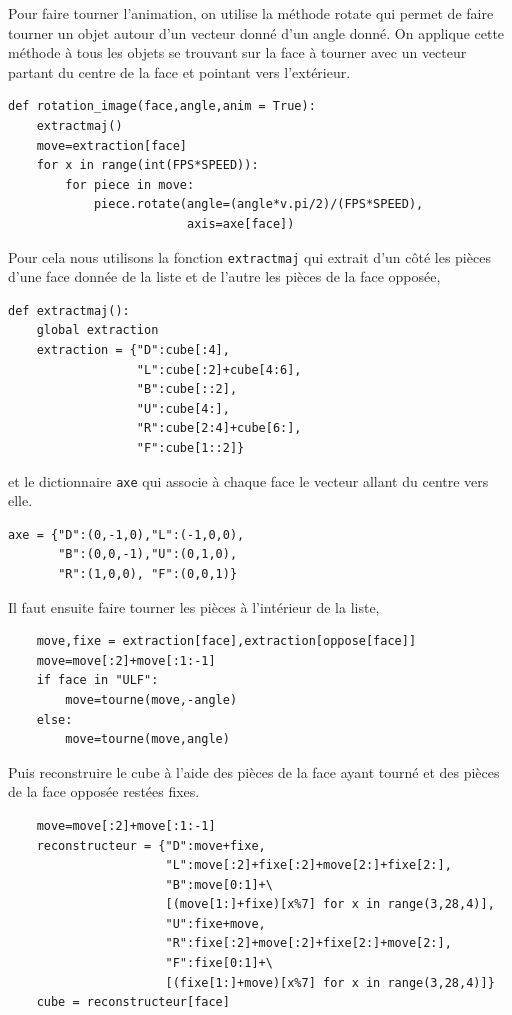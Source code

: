 \documentclass[11pt,a4paper]{article}
\begin{document}
Pour faire tourner l'animation, on utilise la méthode rotate qui permet de faire tourner un objet autour
d'un vecteur donné d'un angle donné. On applique cette méthode à tous les objets se trouvant sur la face
à tourner avec un vecteur partant du centre de la face et pointant vers l'extérieur.
\begin{lstlisting}
def rotation_image(face,angle,anim = True):
    extractmaj()
    move=extraction[face]
    for x in range(int(FPS*SPEED)):
        for piece in move:
            piece.rotate(angle=(angle*v.pi/2)/(FPS*SPEED),
                         axis=axe[face])
\end{lstlisting}
Pour cela nous utilisons la fonction \texttt{extractmaj} qui extrait d'un côté les pièces d'une face donnée de la liste et de l'autre les pièces
de la face opposée,
\begin{lstlisting}
def extractmaj():
    global extraction
    extraction = {"D":cube[:4],
                  "L":cube[:2]+cube[4:6],
                  "B":cube[::2],
                  "U":cube[4:],
                  "R":cube[2:4]+cube[6:],
                  "F":cube[1::2]}
\end{lstlisting} 
et le dictionnaire \texttt{axe} qui associe à chaque face le vecteur allant du centre vers elle.
\begin{lstlisting}
axe = {"D":(0,-1,0),"L":(-1,0,0),
       "B":(0,0,-1),"U":(0,1,0),
       "R":(1,0,0), "F":(0,0,1)}
\end{lstlisting}
\par
Il faut ensuite faire tourner les pièces à l'intérieur de la liste, 
\begin{lstlisting}
    move,fixe = extraction[face],extraction[oppose[face]]
    move=move[:2]+move[:1:-1]
    if face in "ULF":
        move=tourne(move,-angle)
    else:
        move=tourne(move,angle)
\end{lstlisting}
Puis reconstruire le cube à l'aide des pièces de la face ayant tourné et des pièces de la face opposée restées fixes.
\begin{lstlisting}
    move=move[:2]+move[:1:-1] 
    reconstructeur = {"D":move+fixe,
                      "L":move[:2]+fixe[:2]+move[2:]+fixe[2:],
                      "B":move[0:1]+\
                      [(move[1:]+fixe)[x%7] for x in range(3,28,4)],
                      "U":fixe+move,
                      "R":fixe[:2]+move[:2]+fixe[2:]+move[2:],
                      "F":fixe[0:1]+\
                      [(fixe[1:]+move)[x%7] for x in range(3,28,4)]}
    cube = reconstructeur[face]
\end{lstlisting}
\end{document}

